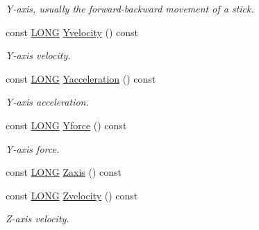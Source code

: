 \begin{DoxyCompactItemize}
\begin{DoxyCompactList}\small\item\em Y-\/axis, usually the forward-\/backward movement of a stick. \end{DoxyCompactList}\item 
\mbox{\label{class_c_joypad_ac50829aebfc52b28593a3269f35b0a5c}} 
const \hyperlink{_joypad_8h_a2a3e0cda5f1249bef6db47c5eb8e3813}{L\+O\+NG} \hyperlink{class_c_joypad_ac50829aebfc52b28593a3269f35b0a5c}{Yvelocity} () const
\begin{DoxyCompactList}\small\item\em Y-\/axis velocity. \end{DoxyCompactList}\item 
\mbox{\label{class_c_joypad_ab2f6e5d0f3608190036b917787deeb33}} 
const \hyperlink{_joypad_8h_a2a3e0cda5f1249bef6db47c5eb8e3813}{L\+O\+NG} \hyperlink{class_c_joypad_ab2f6e5d0f3608190036b917787deeb33}{Yacceleration} () const
\begin{DoxyCompactList}\small\item\em Y-\/axis acceleration. \end{DoxyCompactList}\item 
\mbox{\label{class_c_joypad_a1cceda05c254c0c9e9398cfa4351cac3}} 
const \hyperlink{_joypad_8h_a2a3e0cda5f1249bef6db47c5eb8e3813}{L\+O\+NG} \hyperlink{class_c_joypad_a1cceda05c254c0c9e9398cfa4351cac3}{Yforce} () const
\begin{DoxyCompactList}\small\item\em Y-\/axis force. \end{DoxyCompactList}\item 
const \hyperlink{_joypad_8h_a2a3e0cda5f1249bef6db47c5eb8e3813}{L\+O\+NG} \hyperlink{class_c_joypad_a1ab390e90331bc036447eb4fc477e796}{Zaxis} () const
\item 
\mbox{\label{class_c_joypad_ac1bdd6e6d030d613bc666797405b8ff6}} 
const \hyperlink{_joypad_8h_a2a3e0cda5f1249bef6db47c5eb8e3813}{L\+O\+NG} \hyperlink{class_c_joypad_ac1bdd6e6d030d613bc666797405b8ff6}{Zvelocity} () const
\begin{DoxyCompactList}\small\item\em Z-\/axis velocity. \end{DoxyCompactList}\item 
\mbox{\label{class_c_joypad_aa4853aed25405766be055bdb0c7c06a1}} 

\end{DoxyCompactItemize}
